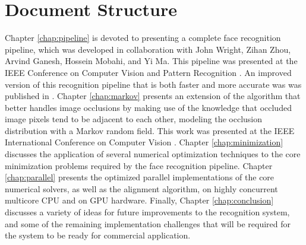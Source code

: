 \section{Document Structure}
%
Chapter \ref{chap:pipeline} is devoted to presenting a complete face
recognition pipeline, which was developed in collaboration with John Wright,
Zihan Zhou, Arvind Ganesh, Hossein Mobahi, and Yi Ma.  This pipeline was
presented at the IEEE Conference on Computer Vision and Pattern Recognition
\cite{WagnerA2009-CVPR}.  An improved version of this recognition pipeline that
is both faster and more accurate was was published in \cite{WagnerA2011-PAMI}.
%
Chapter \ref{chap:markov} presents an extension of the algorithm that better
handles image occlusions by making use of the knowledge that occluded image
pixels tend to be adjacent to each other, modeling the occlusion distribution
with a Markov random field.  This work was presented at the IEEE International
Conference on Computer Vision \cite{ZhouZ2009}.
%
Chapter \ref{chap:minimization} discusses the application of several numerical
optimization techniques to the core minimization problems required by the face
recognition pipeline.
%
Chapter \ref{chap:parallel} presents the optimized parallel implementations of
the core numerical solvers, as well as the alignment algorithm, on highly
concurrent multicore CPU and on GPU hardware.
%
Finally, Chapter \ref{chap:conclusion} discusses a variety of ideas for future
improvements to the recognition system, and some of the remaining
implementation challenges that will be required for the system to be ready for
commercial application.
 
